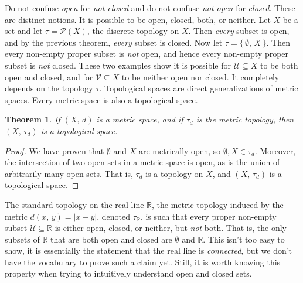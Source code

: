 \documentclass{article}
\theoremstyle{plain}
\newtheorem{theorem}{Theorem}[section]
\theoremstyle{normal}
\newenvironment{example}{%
    \pushQED{\qed}\renewcommand{\qedsymbol}{$\blacksquare$}\examplex%
}{%
    \popQED\endexamplex%
}
\begin{document}
    \begin{example}
        Do not confuse \textit{open} for \textit{not-closed} and do not confuse
        \textit{not-open} for \textit{closed}. These are distinct notions.
        It is possible to be open, closed, both, or neither. Let $X$ be a set
        and let $\tau=\mathcal{P}(X)$, the discrete topology on $X$. Then
        \textit{every} subset is open, and by the previous theorem,
        \textit{every} subset is closed. Now let
        $\tau=\{\,\emptyset,\,X\,\}$. Then every non-empty proper
        subset is \textit{not} open, and hence every non-empty proper subset is
        \textit{not} closed. These two examples show it is possible for
        $\mathcal{U}\subseteq{X}$ to be both open and closed, and for
        $\mathcal{V}\subseteq{X}$ to be neither open nor closed. It completely
        depends on the topology $\tau$.
    \end{example}
    Topological spaces are direct generalizations of metric spaces. Every
    metric space is also a topological space.
    \begin{theorem}
        If $(X,\,d)$ is a metric space, and if $\tau_{d}$ is the metric
        topology, then $(X,\,\tau_{d})$ is a topological space.
    \end{theorem}
    \begin{proof}
        We have proven that $\emptyset$ and $X$ are metrically open, so
        $\emptyset,X\in\tau_{d}$. Moreover, the intersection of two
        open sets in a metric space is open, as is the union of arbitrarily
        many open sets. That is, $\tau_{d}$ is a topology on $X$, and
        $(X,\,\tau_{d})$ is a topological space.
    \end{proof}
    \begin{example}
        The standard topology on the real line $\mathbb{R}$, the metric topology
        induced by the metric $d(x,\,y)=|x-y|$, denoted $\tau_{\mathbb{R}}$,
        is such that every proper non-empty subset
        $\mathcal{U}\subseteq\mathbb{R}$ is either open, closed, or neither,
        but \textit{not} both. That is, the only subsets of $\mathbb{R}$ that
        are both open and closed are $\emptyset$ and $\mathbb{R}$. This isn't
        too easy to show, it is essentially the statement that the real line
        is \textit{connected}, but we don't have the vocabulary to prove such
        a claim yet. Still, it is worth knowing this property when trying to
        intuitively understand open and closed sets.
    \end{example}
\end{document}
